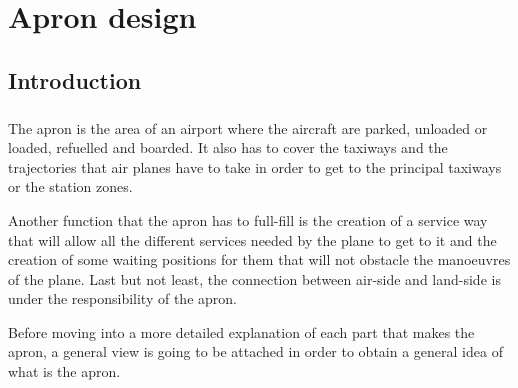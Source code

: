 \chapter{Apron design}

	\section{Introduction}
	\paragraph{}The apron is the area of an airport where the aircraft are parked, unloaded or loaded, refuelled and boarded. It also has to cover the taxiways and the trajectories that air planes have to take in order to get to the principal taxiways or the station zones.  
	
	Another function that the apron has to full-fill is the creation of a service way that will allow all the different services needed by the plane to get to it and the creation of some waiting positions for them that will not obstacle the manoeuvres of the plane. Last but not least, the connection between air-side and land-side is under the responsibility of the apron. 
	
	Before moving into a more detailed explanation of each part that makes the apron, a general view is going to be attached in order to obtain a general idea of what is the apron.
	
